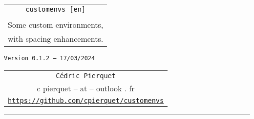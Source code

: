 \documentclass[english,11pt,a4paper]{article}
\def\TPversion{0.1.2}
\def\TPdate{17/03/2024}
\begin{document}
\pagestyle{fancy}

\thispagestyle{empty}

\begin{center}
	\begin{minipage}{0.75\linewidth}
	\begin{tcolorbox}[colframe=yellow,colback=yellow!15]
		\begin{center}
			\renewcommand\arraystretch{1.25}
			\begin{tabular}{c}
				{\Huge \texttt{customenvs [en]}}\\
				\\
				{\Large Some custom environments,} \\
				{\Large with spacing enhancements.} \\
			\end{tabular}
			\renewcommand\arraystretch{1}
			
			\medskip
			
			{\small \texttt{Version \TPversion{} -- \TPdate}}
		\end{center}
	\end{tcolorbox}
\end{minipage}
\end{center}

\vspace*{1mm}

\begin{center}
	\begin{tabular}{c}
	\texttt{Cédric Pierquet}\\
	{\ttfamily c pierquet -- at -- outlook . fr}\\
	\texttt{\url{https://github.com/cpierquet/customenvs}}
\end{tabular}
\end{center}

\vspace*{5mm}

%
%
%
%
%

\hrule


\hypertarget{matoc}{}

\tableofcontents

\vspace*{5mm}
\end{document}
